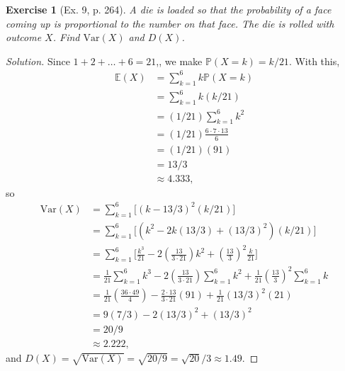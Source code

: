 \documentclass[letterpaper, 10 pt, conference]{article}
\newtheorem{ex}{Exercise}
\newcommand\E{\ensuremath{\mathbb{E}}}
\renewcommand{\P}{\ensuremath{\mathbb{P}}}
\newcommand\V{\ensuremath{\mathrm{Var}}}
\begin{document}
\begin{ex}[Ex. 9, p. 264]
	A die is loaded so that the probability of a face coming up is proportional to the number on that face. The die is rolled with outcome $X$. Find $\V(X)$ and $D(X)$. 
\end{ex}
\begin{proof}[Solution]
	Since $1+2+\dots+6 = 21$,, we make $\P(X = k) = k/21$. With this, 
	\begin{align}
		\E(X) &= \sum_{k = 1}^{6} k \P(X = k)\\
		&= \sum_{k = 1}^{6} k (k/21)\\
		&= (1/21) \sum_{k = 1}^{6} k^2 \\
		&= (1/21) \frac{6 \cdot 7 \cdot 13}{6}\\
		&= (1/21) (91) \\
		&= 13/3 \\
		&\approx 4.333,
	\end{align}
	so 
	\begin{align}
		\V(X) &= \sum_{k = 1}^{6} \lbrack (k-13/3)^2 (k/21) \rbrack\\
		&= \sum_{k = 1}^{6} \lbrack (k^2 - 2k(13/3) + (13/3)^2) (k/21) \rbrack\\
		&= \sum_{k = 1}^{6} \lbrack \frac{k^3}{21} - 2 (\frac{13}{3 \cdot 21}) k^2 + (\frac{13}{3})^2 \frac{k}{21} \rbrack \\
		&= \frac{1}{21} \sum_{k = 1}^{6}  k^3 - 2 (\frac{13}{3 \cdot 21}) \sum_{k = 1}^{6} k^2 + \frac{1}{21}(\frac{13}{3})^2 \sum_{k = 1}^{6} k \\
		&= \frac{1}{21} (\frac{36 \cdot 49}{4}) - \frac{2 \cdot 13}{3 \cdot 21} (91) + \frac{1}{21} (13/3)^2 (21)\\
		&= 9 (7/3) - 2 (13/3)^2 + (13/3)^2\\
		&= 20/9\\
		&\approx 2.222,
	\end{align}
	and $D(X) = \sqrt{\V(X)} = \sqrt{20/9} = \sqrt{20}/3 \approx 1.49$.
\end{proof}
\end{document}

